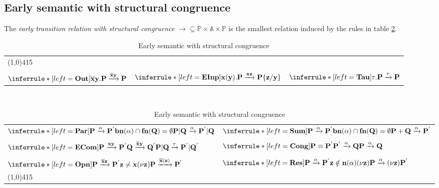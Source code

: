 \subsection{Early semantic with structural congruence}

\begin{definition}
  The \emph{early transition relation with structural congruence} $\rightarrow\subseteq \mathbb{P}\times \mathbb{A} \times \mathbb{P}$ is the smallest relation induced by the rules in table \ref{earlysemanticwithstructuralcongruence}.

  \begin{table}
    \begin{tabular}{lll}  
      	\multicolumn{3}{l}{\line(1,0){415}}\\\\
	  $\inferrule* [left=\bf{Out}]{
	  }{
	    \overline{x}y.P \xrightarrow{\overline{x}y} P
	  }$
	&
	  $\inferrule* [left=\bf{EInp}]{
	  }{
	    x(y).P \xrightarrow{xz} P\{z/y\}
	  }$
	&
	  $\inferrule* [left=\bf{Tau}]{
	  }{
	    \tau.P \xrightarrow{\tau} P
	  }$
      \\
    \end{tabular}
    \\
    \begin{tabular}{ll}  
      \\
	  $\inferrule* [left=\bf{Par}]{
	      P \xrightarrow{\alpha} P^{'}
	    \\
	      bn(\alpha)\cap fn(Q)=\emptyset
	  }{
	    P|Q \xrightarrow{\alpha} P^{'}|Q
	  }$
	  &
	  $\inferrule* [left=\bf{Sum}]{
	      P \xrightarrow{\alpha} P^{'}
	    \\
	      bn(\alpha)\cap fn(Q)=\emptyset
	  }{
	    P+Q \xrightarrow{\alpha} P^{'}
	  }$
      \\\\
	  $\inferrule* [left=\bf{ECom}]{
	      P \xrightarrow{xy} P^{'}
	    \\
	      Q\xrightarrow{\overline{x}y} Q^{'}
	  }{
	    P|Q \xrightarrow{\tau} P^{'}|Q^{'}
	  }$
	  &
	  $\inferrule* [left=\bf{Cong}]{
	      P\equiv P^{'}
	    \\
	      P^{'}\xrightarrow{\alpha} Q
	  }{
	    P \xrightarrow{\alpha} Q
	  }$
      \\\\
	  $\inferrule* [left=\bf{Opn}]{
	      P \xrightarrow{\overline{x}z} P^{'}
	    \\
	      z\neq x
	  }{
	    (\nu z) P \xrightarrow{\overline{x}(z)} P^{'}
	  }$
	  &
	  $\inferrule* [left=\bf{Res}]{
	      P \xrightarrow{\alpha} P^{'}
	    \\
	      z\notin n(\alpha)
	  }{
	    (\nu z) P \xrightarrow{\alpha} (\nu z) P^{'}
	  }$
      \\	\multicolumn{2}{l}{\line(1,0){415}}
    \end{tabular}
    \caption{Early semantic with structural congruence}
    \label{earlysemanticwithstructuralcongruence}
  \end{table}
\end{definition}


